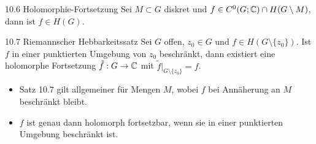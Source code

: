 \begin{satz}{10.6 Holomorphie-Fortsetzung}
Sei $M \subset G$ diskret und $f \in C^0(G; \mathbb{C}) \cap H(G \setminus M)$, dann ist $f \in H(G)$.
\end{satz}

\begin{satz}{10.7 Riemannscher Hebbarkeitssatz}
Sei $G$ offen, $z_0 \in G$ und $f \in H(G \setminus \{z_0\})$. Ist $f$ in einer punktierten Umgebung von $z_0$ beschränkt, dann existiert eine holomorphe Fortsetzung $\tilde{f}: G \to \mathbb{C}$ mit $\tilde{f}|_{G \setminus \{z_0\}} = f$.
\end{satz}

\begin{tcolorbox}[colback=white, colframe=black!70, title={Bemerkung 10.8}]
\begin{itemize}
    \item[i)] Satz 10.7 gilt allgemeiner für Mengen $M$, wobei $f$ bei Annäherung an $M$ beschränkt bleibt.
    \item[ii)] $f$ ist genau dann holomorph fortsetzbar, wenn sie in einer punktierten Umgebung beschränkt ist.
\end{itemize}
\end{tcolorbox}